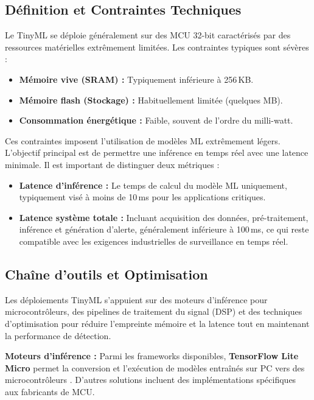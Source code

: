 \subsection{Définition et Contraintes Techniques}

Le TinyML se déploie généralement sur des MCU 32-bit caractérisés par des ressources matérielles extrêmement limitées. Les contraintes typiques sont sévères :
\begin{itemize}
\item \textbf{Mémoire vive (SRAM) :} Typiquement inférieure à 256\,KB.
\item \textbf{Mémoire flash (Stockage) :} Habituellement limitée (quelques MB).
\item \textbf{Consommation énergétique :} Faible, souvent de l'ordre du milli-watt.
\end{itemize}

Ces contraintes imposent l'utilisation de modèles ML extrêmement légers. L'objectif principal est de permettre une inférence en temps réel avec une latence minimale. Il est important de distinguer deux métriques :
\begin{itemize}
\item \textbf{Latence d'inférence :} Le temps de calcul du modèle ML uniquement, typiquement visé à moins de 10\,ms pour les applications critiques.
\item \textbf{Latence système totale :} Incluant acquisition des données, pré-traitement, inférence et génération d'alerte, généralement inférieure à 100\,ms, ce qui reste compatible avec les exigences industrielles de surveillance en temps réel.
\end{itemize}

\subsection{Chaîne d'outils et Optimisation}

Les déploiements TinyML s'appuient sur des moteurs d'inférence pour microcontrôleurs, des pipelines de traitement du signal (DSP) et des techniques d'optimisation pour réduire l'empreinte mémoire et la latence tout en maintenant la performance de détection.

\textbf{Moteurs d'inférence :} Parmi les frameworks disponibles, \textbf{TensorFlow Lite Micro} permet la conversion et l'exécution de modèles entraînés sur PC vers des microcontrôleurs \cite{tsoukas2024}. D'autres solutions incluent des implémentations spécifiques aux fabricants de MCU.

